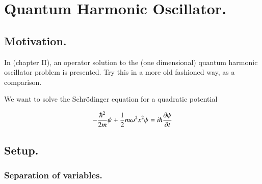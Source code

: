 
%
%




\chapter{Quantum Harmonic Oscillator. }
\date{ April 19, 2009.  $RCSfile: harmonicOsc.tex,v $ Last $Revision: 1.14 $ $Date: 2009/06/11 17:00:37 $ }

%

\section{Motivation. }

In \cite{byron1992mca} (chapter II), an operator solution to the
(one dimensional) quantum
harmonic oscillator problem is presented.  Try this in a more old fashioned way,
as a comparison.

We want to solve the Schr\"{o}dinger equation for a quadratic potential

\begin{align}\label{eqn:harmonic_osc:toSolve}
-\frac{\hbar^2}{2m} \psi + \frac{1}{2} m \omega^2 x^2 \psi = i \hbar \frac{\partial {\psi}}{\partial {t}}
\end{align}

\section{Setup. }

\subsection{Separation of variables. }

